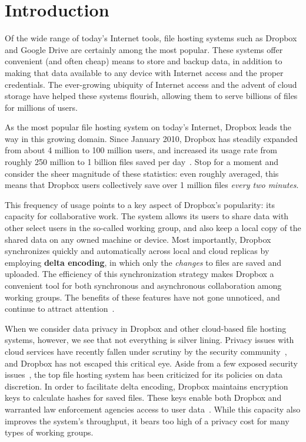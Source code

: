 \section{Introduction}
\label{introduction}
Of the wide range of today's Internet tools,
file hosting systems such as Dropbox and Google Drive are certainly among the most popular.
These systems offer convenient (and often cheap) means
to store and backup data, in addition to making that data available
to any device with Internet access and the proper credentials.
The ever-growing ubiquity of Internet access
and the advent of cloud storage have helped
these systems flourish,
allowing them to serve billions of files for millions of users.

As the most popular file hosting system on today's Internet,
Dropbox leads the way in this growing domain.
Since January 2010, Dropbox has steadily expanded from about 4 million to 100 million users,
and increased its usage rate from roughly 250 million to 1 billion files saved per day~\cite{dropboxstats}.
Stop for a moment and consider the sheer magnitude of these statistics:
even roughly averaged, this means that Dropbox users collectively save over
1 million files \emph{every two minutes}.

This frequency of usage points to a key aspect of Dropbox's popularity:
its capacity for collaborative work.
The system allows its users to share data with other select users
in the so-called working group, and also keep a local copy
of the shared data on any owned machine or device.
Most importantly, Dropbox synchronizes quickly and automatically across local and cloud replicas
by employing \textbf{delta encoding},
in which only the \emph{changes} to files are saved and uploaded.
The efficiency of this synchronization strategy makes Dropbox a convenient tool
for both synchronous and asynchronous collaboration among working groups.
The benefits of these features have not gone
unnoticed, and continue to attract attention~\cite{dropboxmercurial,dropboxcollab}.

When we consider data privacy in Dropbox and other cloud-based file hosting systems, however, we see that not everything is silver lining.
Privacy issues with cloud services have recently
fallen under scrutiny by the security community~\cite{van2010impossibility,soghoian2010caught}, and Dropbox has not escaped this critical eye.
Aside from a few exposed security issues~\cite{mulazzani2011dark,dropboxsecurity},
the top file hosting system has been criticized for its policies on data discretion.
In order to facilitate delta encoding,
Dropbox maintains encryption keys to calculate hashes for saved files.
These keys enable both Dropbox and warranted law enforcement agencies
access to user data~\cite{dropboxprivacy}.
While this capacity also improves the system's throughput,
it bears too high of a privacy cost for many types of working groups.

